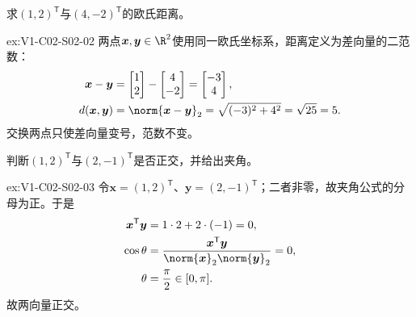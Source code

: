 \begin{SLChapterExercisePairSection}
\begin{exercise}[距离]\label{ex:V1-C02-S02-02}
求$(1,2)^{\mathsf T}$与$(4,-2)^{\mathsf T}$的欧氏距离。
\end{exercise}
\label{sol:V1-C02-S02-02}
\begin{chapterexercisesolution}{ex:V1-C02-S02-02}
两点$\boldsymbol{x},\boldsymbol{y}\in\R^2$使用同一欧氏坐标系，距离定义为差向量的二范数：
\[
\begin{aligned}
\boldsymbol{x}-\boldsymbol{y}
&=\begin{bmatrix}1\\2\end{bmatrix}-\begin{bmatrix}4\\-2\end{bmatrix}
=\begin{bmatrix}-3\\4\end{bmatrix},\\
d(\boldsymbol{x},\boldsymbol{y})
&=\norm{\boldsymbol{x}-\boldsymbol{y}}_2
=\sqrt{(-3)^2+4^2}=\sqrt{25}=5.
\end{aligned}
\]
交换两点只使差向量变号，范数不变。
\end{chapterexercisesolution}

\begin{exercise}[夹角与正交]\label{ex:V1-C02-S02-03}
判断$(1,2)^{\mathsf T}$与$(2,-1)^{\mathsf T}$是否正交，并给出夹角。
\end{exercise}
\label{sol:V1-C02-S02-03}
\begin{chapterexercisesolution}{ex:V1-C02-S02-03}
令$\boldsymbol{x}=(1,2)^{\mathsf T}$、$\boldsymbol{y}=(2,-1)^{\mathsf T}$；二者非零，故夹角公式的分母为正。于是
\[
\begin{aligned}
\boldsymbol{x}^{\mathsf T}\boldsymbol{y}
&=1\cdot2+2\cdot(-1)=0,\\
\cos\theta
&=\frac{\boldsymbol{x}^{\mathsf T}\boldsymbol{y}}
{\norm{\boldsymbol{x}}_2\norm{\boldsymbol{y}}_2}=0,\\
\theta&=\frac{\pi}{2}\in[0,\pi].
\end{aligned}
\]
故两向量正交。
\end{chapterexercisesolution}


\end{SLChapterExercisePairSection}
